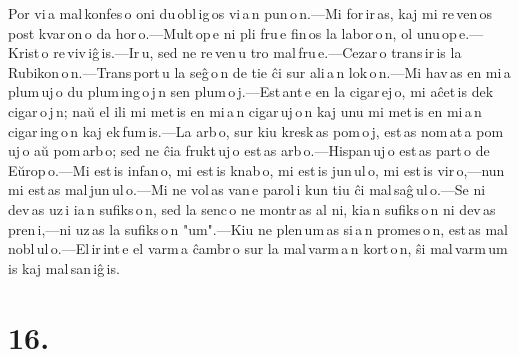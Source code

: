 \documentclass[ngerman,12pt,twoside]{book}
\begin{document}
Por vi\,a mal\,konfes\,o oni du\,obl\,ig\,os vi\,a\,n pun\,o\,n.---Mi for\,ir\,as, kaj mi re\,ven\,os post kvar\,on\,o da hor\,o.---Mult\,op\,e ni pli fru\,e fin\,os la labor\,o\,n, ol unu\,op\,e.---Krist\,o re\,viv\,iĝ\,is.---Ir\,u, sed ne re\,ven\,u tro mal\,fru\,e.---Cezar\,o trans\,ir\,is la Rubikon\,o\,n.---Trans\,port\,u la seĝ\,o\,n de tie ĉi sur ali\,a\,n lok\,o\,n.---Mi hav\,as en mi\,a plum\,uj\,o du plum\,ing\,o\,j\,n sen plum\,o\,j.---Est\,ant\,e en la cigar\,ej\,o, mi aĉet\,is dek cigar\,o\,j\,n; naŭ el ili mi met\,is en mi\,a\,n cigar\,uj\,o\,n kaj unu mi met\,is en mi\,a\,n cigar\,ing\,o\,n kaj ek\,fum\,is.---La arb\,o, sur kiu kresk\,as pom\,o\,j, est\,as nom\,at\,a pom\,uj\,o aŭ pom\,arb\,o; sed ne ĉia frukt\,uj\,o est\,as arb\,o.---Hispan\,uj\,o est\,as part\,o de Eŭrop\,o.---Mi est\,is infan\,o, mi est\,is knab\,o, mi est\,is jun\,ul\,o, mi est\,is vir\,o,---nun mi est\,as mal\,jun\,ul\,o.---Mi ne vol\,as van\,e parol\,i kun tiu ĉi mal\,saĝ\,ul\,o.---Se ni dev\,as uz\,i ia\,n sufiks\,o\,n, sed la senc\,o ne montr\,as al ni, kia\,n sufiks\,o\,n ni dev\,as pren\,i,---ni uz\,as la sufiks\,o\,n "um".---Kiu ne plen\,um\,as si\,a\,n promes\,o\,n, est\,as mal\,nobl\,ul\,o.---El\,ir\,int\,e el varm\,a ĉambr\,o sur la mal\,varm\,a\,n kort\,o\,n, ŝi mal\,varm\,um\,is kaj mal\,san\,iĝ\,is.

\section*{16.}
\end{document}
